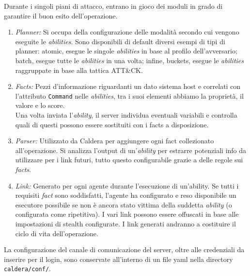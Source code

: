 \begin{itemize}
        Durante i singoli piani di attacco, entrano in gioco dei moduli in grado di garantire il buon esito dell'operazione.
        \begin{enumerate}
            \item \textit{Planner:} Si occupa della configurazione delle modalità secondo cui vengono eseguite le \textit{abilities}. Sono disponibili di default diversi esempi di tipi di planner: atomic, esegue le singole \textit{abilities} in base al profilo dell'avversario; batch, esegue tutte le \textit{abilities} in una volta; infine, buckets, esegue le \textit{abilities} raggruppate in base alla tattica ATT\&CK.
            \item \textit{Facts:} Pezzi d'informazione riguardanti un dato sistema host e correlati con l'attributo \texttt{Command} nelle \textit{abilities}, tra i suoi elementi abbiamo la proprietà, il valore e lo score.\\
            Una volta inviata l'\textit{ability}, il server individua eventuali variabili e controlla quali di questi possono essere sostituiti con i facts a disposizione.
            \item \textit{Parser:} Utilizzato da Caldera per aggiungere ogni fact collezionato all'operazione. Si analizza l'output di un'\textit{ability} per estrarre potenziali info da utilizzare per i link futuri, tutto questo configurabile grazie a delle regole sui \textit{facts}.
            \item \textit{Link:} Generato per ogni agente durante l'esecuzione di un'ability. Se tutti i requisiti \textit{fact} sono soddisfatti, l'agente ha configurato e reso disponibile un esecutore possibile se non è ancora stato vittima della suddetta \textit{ability} (o configurata come ripetitiva). I vari link possono essere offuscati in base alle impostazioni di stealth configurate. I link generati andranno a costituire il ciclo di vita dell'operazione.
        \end{enumerate}
    \end{itemize}
    La configurazione del canale di comunicazione del server, oltre alle credenziali da inserire per il login, sono conservate all'interno di un file yaml nella directory \texttt{caldera/conf/}.

